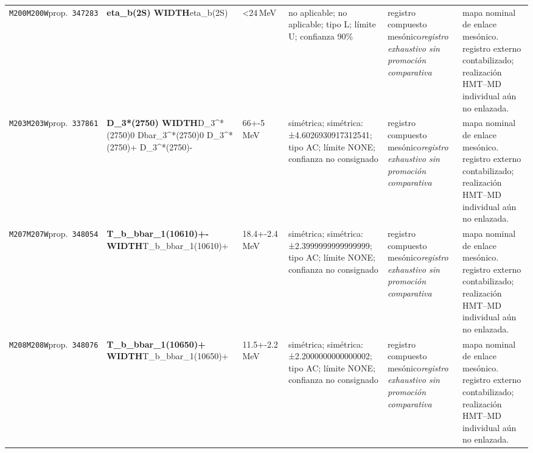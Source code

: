 \begin{landscape}
\begin{longtable}{L{1.85cm}L{4.45cm}L{2.35cm}L{4.05cm}L{3.35cm}L{7.15cm}}
\texttt{M200}\newline \texttt{M200W}\newline prop.\ \texttt{347283} & \textbf{eta\_\allowbreak{}b(2S) WIDTH}\newline eta\_\allowbreak{}b(2S) & \textless{}24\,MeV & no aplicable; no aplicable; tipo L; límite U; confianza 90\% & registro compuesto mesónico\newline \emph{registro exhaustivo sin promoción comparativa} & mapa nominal de enlace mesónico. registro externo contabilizado; realización HMT--MD individual aún no enlazada. \\
\texttt{M203}\newline \texttt{M203W}\newline prop.\ \texttt{337861} & \textbf{D\_\allowbreak{}3*(2750) WIDTH}\newline D\_\allowbreak{}3\textasciicircum{}*(2750)0 \textbar{}\allowbreak{} Dbar\_\allowbreak{}3\textasciicircum{}*(2750)0 \textbar{}\allowbreak{} D\_\allowbreak{}3\textasciicircum{}*(2750)+ \textbar{}\allowbreak{} D\_\allowbreak{}3\textasciicircum{}*(2750)- & 66+-5\,MeV & simétrica; simétrica: ±4.6026930917312541; tipo AC; límite NONE; confianza no consignado & registro compuesto mesónico\newline \emph{registro exhaustivo sin promoción comparativa} & mapa nominal de enlace mesónico. registro externo contabilizado; realización HMT--MD individual aún no enlazada. \\
\texttt{M207}\newline \texttt{M207W}\newline prop.\ \texttt{348054} & \textbf{T\_\allowbreak{}b\_\allowbreak{}bbar\_\allowbreak{}1(10610)+- WIDTH}\newline T\_\allowbreak{}b\_\allowbreak{}bbar\_\allowbreak{}1(10610)+ & 18.4+-2.4\,MeV & simétrica; simétrica: ±2.3999999999999999; tipo AC; límite NONE; confianza no consignado & registro compuesto mesónico\newline \emph{registro exhaustivo sin promoción comparativa} & mapa nominal de enlace mesónico. registro externo contabilizado; realización HMT--MD individual aún no enlazada. \\
\texttt{M208}\newline \texttt{M208W}\newline prop.\ \texttt{348076} & \textbf{T\_\allowbreak{}b\_\allowbreak{}bbar\_\allowbreak{}1(10650)+ WIDTH}\newline T\_\allowbreak{}b\_\allowbreak{}bbar\_\allowbreak{}1(10650)+ & 11.5+-2.2\,MeV & simétrica; simétrica: ±2.2000000000000002; tipo AC; límite NONE; confianza no consignado & registro compuesto mesónico\newline \emph{registro exhaustivo sin promoción comparativa} & mapa nominal de enlace mesónico. registro externo contabilizado; realización HMT--MD individual aún no enlazada. \\

\end{longtable}
\end{landscape}
